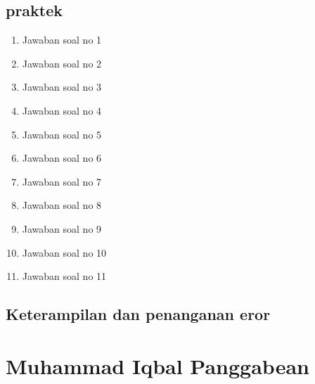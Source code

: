 \subsection{praktek}
\begin{enumerate}
    \item Jawaban soal no 1
    
    \item Jawaban soal no 2
    
    \item Jawaban soal no 3
    
    \item Jawaban soal no 4
    
    \item Jawaban soal no 5
    
    \item Jawaban soal no 6
    
    \item Jawaban soal no 7
    
    \item Jawaban soal no 8
    
    \item Jawaban soal no 9
    
    \item Jawaban soal no 10
    
    \item Jawaban soal no 11
    
\end{enumerate}

\subsection{Keterampilan dan penanganan eror}
    

\section{Muhammad Iqbal Panggabean}
